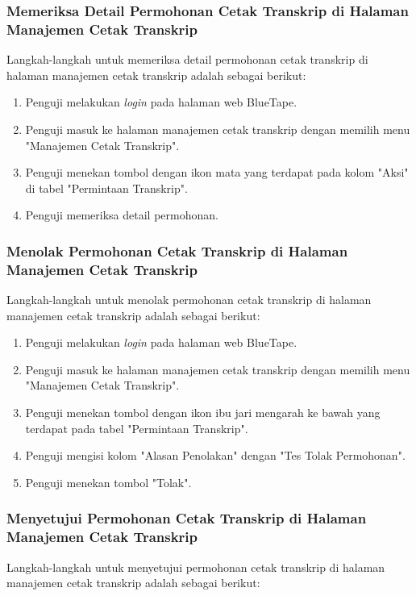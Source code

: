 \subsubsection{Memeriksa Detail Permohonan Cetak Transkrip di Halaman Manajemen Cetak Transkrip}
\label{subsubsec:skenario_memeriksa_detail_permohonan_cetak_transkrip_di_halaman_manajemen_cetak_transkrip}
Langkah-langkah untuk memeriksa detail permohonan cetak transkrip di halaman manajemen cetak transkrip adalah sebagai berikut:

\begin{enumerate}
    \item Penguji melakukan \textit{login} pada halaman web BlueTape.
    \item Penguji masuk ke halaman manajemen cetak transkrip dengan memilih menu "Manajemen Cetak Transkrip".
    \item Penguji menekan tombol dengan ikon mata yang terdapat pada kolom "Aksi" di tabel "Permintaan Transkrip".
    \item Penguji memeriksa detail permohonan.
\end{enumerate}

\subsubsection{Menolak Permohonan Cetak Transkrip di Halaman Manajemen Cetak Transkrip}
\label{subsubsec:skenario_menolak_permohonan_cetak_transkrip_di_halaman_manajemen_cetak_transkrip}
Langkah-langkah untuk menolak permohonan cetak transkrip di halaman manajemen cetak transkrip adalah sebagai berikut:

\begin{enumerate}
    \item Penguji melakukan \textit{login} pada halaman web BlueTape.
    \item Penguji masuk ke halaman manajemen cetak transkrip dengan memilih menu "Manajemen Cetak Transkrip".
    \item Penguji menekan tombol dengan ikon ibu jari mengarah ke bawah yang terdapat pada tabel "Permintaan Transkrip".
    \item Penguji mengisi kolom "Alasan Penolakan" dengan "Tes Tolak Permohonan".
    \item Penguji menekan tombol "Tolak".
\end{enumerate}

\subsubsection{Menyetujui Permohonan Cetak Transkrip di Halaman Manajemen Cetak Transkrip}
\label{subsubsec:skenario_menyetujui_permohonan_cetak_transkrip_di_halaman_manajemen_cetak_transkrip}
Langkah-langkah untuk menyetujui permohonan cetak transkrip di halaman manajemen cetak transkrip adalah sebagai berikut:

